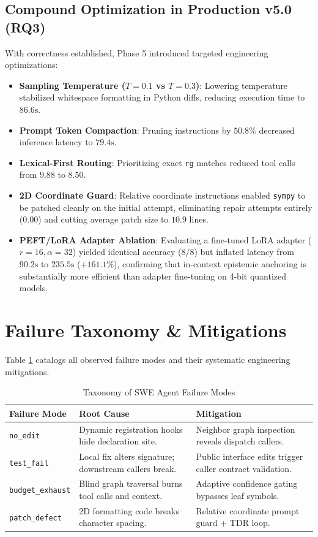 \documentclass[10pt,twocolumn,letterpaper]{article}
\begin{document}
\subsection{Compound Optimization in Production v5.0 (RQ3)}
With correctness established, Phase 5 introduced targeted engineering optimizations:
\begin{itemize}
    \item \textbf{Sampling Temperature ($T=0.1$ vs $T=0.3$)}: Lowering temperature stabilized whitespace formatting in Python diffs, reducing execution time to $86.6\text{s}$.
    \item \textbf{Prompt Token Compaction}: Pruning instructions by $50.8\%$ decreased inference latency to $79.4\text{s}$.
    \item \textbf{Lexical-First Routing}: Prioritizing exact \texttt{rg} matches reduced tool calls from $9.88$ to $8.50$.
    \item \textbf{2D Coordinate Guard}: Relative coordinate instructions enabled \texttt{sympy} to be patched cleanly on the initial attempt, eliminating repair attempts entirely ($0.00$) and cutting average patch size to $10.9$ lines.
    \item \textbf{PEFT/LoRA Adapter Ablation}: Evaluating a fine-tuned LoRA adapter \cite{hu2021lora} ($r=16, \alpha=32$) yielded identical accuracy ($8/8$) but inflated latency from $90.2\text{s}$ to $235.5\text{s}$ ($+161.1\%$), confirming that in-context epistemic anchoring is substantially more efficient than adapter fine-tuning on 4-bit quantized models.
\end{itemize}

\section{Failure Taxonomy \& Mitigations}
Table \ref{tab:taxonomy} catalogs all observed failure modes and their systematic engineering mitigations.

\begin{table}[h]
\centering
\small
\caption{Taxonomy of SWE Agent Failure Modes}
\label{tab:taxonomy}
\begin{tabularx}{\columnwidth}{lXl}
\toprule
\textbf{Failure Mode} & \textbf{Root Cause} & \textbf{Mitigation} \\
\midrule
\texttt{no\_edit} & Dynamic registration hooks hide declaration site. & Neighbor graph inspection reveals dispatch callers. \\
\texttt{test\_fail} & Local fix alters signature; downstream callers break. & Public interface edits trigger caller contract validation. \\
\texttt{budget\_exhaust} & Blind graph traversal burns tool calls and context. & Adaptive confidence gating bypasses leaf symbols. \\
\texttt{patch\_defect} & 2D formatting code breaks character spacing. & Relative coordinate prompt guard + TDR loop. \\
\bottomrule
\end{tabularx}
\end{table}
\end{document}
